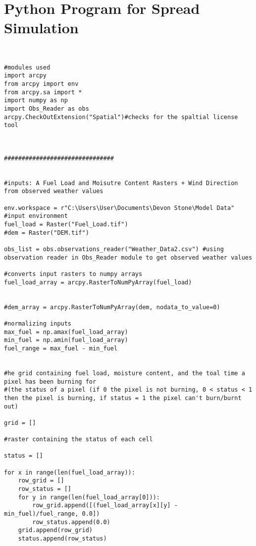 
\chapter{Python Program for Spread Simulation} %

\label{AppendixC} %

\begin{lstlisting}


#modules used
import arcpy
from arcpy import env
from arcpy.sa import *
import numpy as np
import Obs_Reader as obs
arcpy.CheckOutExtension("Spatial")#checks for the spaltial license tool



###############################


#inputs: A Fuel Load and Moisutre Content Rasters + Wind Direction from observed weather values 

env.workspace = r"C:\Users\User\Documents\Devon Stone\Model Data" #input environment
fuel_load = Raster("Fuel_Load.tif")
#dem = Raster("DEM.tif")

obs_list = obs.observations_reader("Weather_Data2.csv") #using observation reader in Obs_Reader module to get observed weather values

#converts input rasters to numpy arrays
fuel_load_array = arcpy.RasterToNumPyArray(fuel_load)


#dem_array = arcpy.RasterToNumPyArray(dem, nodata_to_value=0)

#normalizing inputs
max_fuel = np.amax(fuel_load_array)
min_fuel = np.amin(fuel_load_array)
fuel_range = max_fuel - min_fuel


#he grid containing fuel load, moisture content, and the toal time a pixel has been burning for
#(the status of a pixel (if 0 the pixel is not burning, 0 < status < 1 then the pixel is burning, if status = 1 the pixel can't burn/burnt out)

grid = []

#raster containing the status of each cell

status = []

for x in range(len(fuel_load_array)):
    row_grid = []
    row_status = []
    for y in range(len(fuel_load_array[0])): 
        row_grid.append([(fuel_load_array[x][y] - min_fuel)/fuel_range, 0.0])
        row_status.append(0.0)
    grid.append(row_grid)
    status.append(row_status)


\end{lstlisting}

